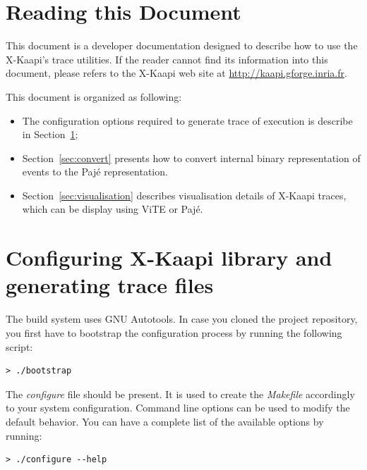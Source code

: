 \documentclass{article}[12pt]
\newcommand{\kaapi}{\textsc{X}-Kaapi\xspace}
\begin{document}
\newpage
\section*{Reading this Document}
This document is a developer documentation designed to describe how to use the
\kaapi's trace utilities. If the reader cannot find its information into this
document, please refers to the \kaapi web site at
\url{http://kaapi.gforge.inria.fr}.

This document is organized as following:
\begin{itemize}
\item The configuration options required to generate trace of execution is describe in Section~\ref{sec:option};
\item Section~\ref{sec:convert} presents how to convert internal binary representation of events to the Paj\'e representation.
\item Section~\ref{sec:visualisation} describes visualisation details of \kaapi traces, which
can be display using ViTE or Paj\'e.
\end{itemize}

\newpage
\section{Configuring \kaapi library and generating trace files} \label{sec:option}

The build system uses GNU Autotools.
In case you cloned the project repository, you first have to bootstrap the configuration process by running the following script:
\begin{verbatim}
> ./bootstrap
\end{verbatim}
The \textit{configure} file should be present. 
It is used to create the \textit{Makefile} accordingly to your system configuration. Command line
options can be used to modify the default behavior. You can have a complete
list of the available options by running:
\begin{verbatim}
> ./configure --help
\end{verbatim}
\end{document}
